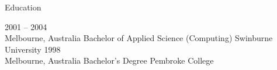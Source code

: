 \documentclass[9pt]{developercv} %
\begin{document}

\begin{cvsect}{Education}

  \begin{entrylist}
    \entry
      {2001 -- 2004\\\footnotesize{Melbourne, Australia}}
      {Bachelor of Applied Science (Computing)}
      {Swinburne University}
      {}
    \entry
      {1998\\\footnotesize{Melbourne, Australia}}
      {Bachelor's Degree}
      {Pembroke College}
      {}
  \end{entrylist}
\end{cvsect}








\end{document}
